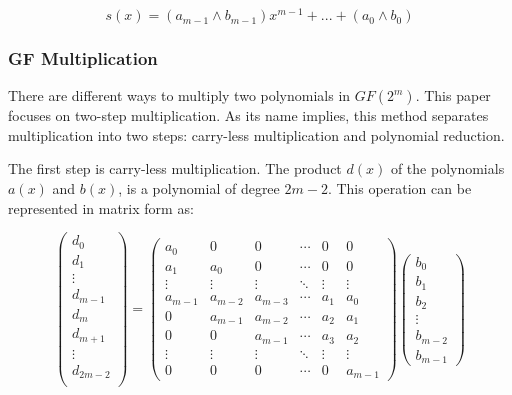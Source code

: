 \begin{equation}
 s(x) = (a_{m-1}\wedge b_{m-1})x^{m-1} + ... + (a_{0}\wedge b_{0})
 \label{eq:4}
\end{equation}


\subsubsection{GF Multiplication}

There are different ways to multiply two polynomials in $GF(2^m)$. This paper focuses on two-step multiplication. As its name implies, 
this method separates multiplication into two steps: carry-less multiplication and polynomial reduction.


The first step is carry-less multiplication. The product $d(x)$ of the polynomials $a(x)$ and $b(x)$, is a polynomial of degree $2m-2$. 
This operation can be represented in matrix form as:

\begin{equation}
    \begin{pmatrix}
    d_{0} \\
    d_{1} \\
    \vdots \\
    d_{m-1} \\
    d_{m} \\
    d_{m+1} \\
    \vdots \\
    d_{2m-2} \\
    \end{pmatrix}
    =
    \begin{pmatrix}
        a_{0} & 0 & 0 & \cdots & 0 & 0 \\
        a_{1} & a_{0} & 0 & \cdots & 0 & 0 \\
        \vdots & \vdots & \vdots & \ddots & \vdots & \vdots \\
        a_{m-1} & a_{m-2} & a_{m-3} & \cdots & a_{1} & a_{0} \\
        0 & a_{m-1} & a_{m-2} & \cdots & a_{2} & a_{1} \\
        0 & 0 & a_{m-1} & \cdots & a_{3} & a_{2} \\
        \vdots & \vdots & \vdots & \ddots & \vdots & \vdots \\
        0 & 0 & 0 & \cdots & 0 & a_{m-1} 
    \end{pmatrix}
    \begin{pmatrix}
        b_{0} \\
        b_{1} \\
        b_{2} \\
        \vdots \\
        b_{m-2} \\
        b_{m-1} 
    \end{pmatrix}
\end{equation}

